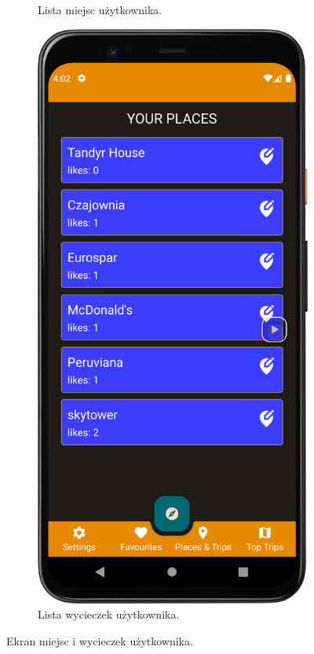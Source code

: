 \begin{figure}[H]
\begin{subfigure}[b]{0.3\textwidth}
                \caption{Lista miejsc użytkownika.\label{user_places}}
            \end{subfigure}
            \hfill
            \begin{subfigure}[b]{0.3\textwidth}
                \centering
                \includegraphics[width=\textwidth]{src/app/user_places.png}
                \caption{Lista wycieczek użytkownika.\label{user_trips}}
            \end{subfigure}
            \caption{Ekran miejsc i wycieczek użytkownika.\label{user_stuff}}
            \qquad
        \end{figure} 
        \vspace{1cm}

